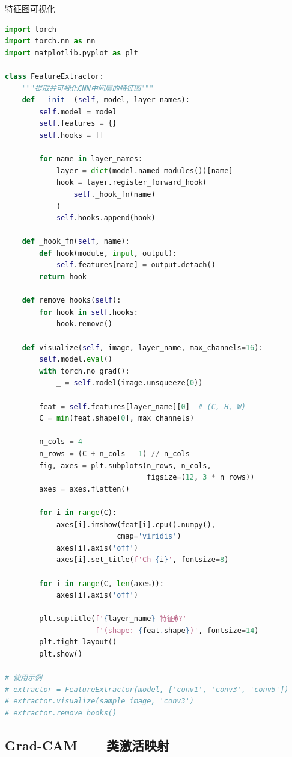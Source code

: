 \begin{mycode}{特征图可视化}
\begin{lstlisting}[language=Python]
import torch
import torch.nn as nn
import matplotlib.pyplot as plt

class FeatureExtractor:
    """提取并可视化CNN中间层的特征图"""
    def __init__(self, model, layer_names):
        self.model = model
        self.features = {}
        self.hooks = []

        for name in layer_names:
            layer = dict(model.named_modules())[name]
            hook = layer.register_forward_hook(
                self._hook_fn(name)
            )
            self.hooks.append(hook)

    def _hook_fn(self, name):
        def hook(module, input, output):
            self.features[name] = output.detach()
        return hook

    def remove_hooks(self):
        for hook in self.hooks:
            hook.remove()

    def visualize(self, image, layer_name, max_channels=16):
        self.model.eval()
        with torch.no_grad():
            _ = self.model(image.unsqueeze(0))

        feat = self.features[layer_name][0]  # (C, H, W)
        C = min(feat.shape[0], max_channels)

        n_cols = 4
        n_rows = (C + n_cols - 1) // n_cols
        fig, axes = plt.subplots(n_rows, n_cols,
                                 figsize=(12, 3 * n_rows))
        axes = axes.flatten()

        for i in range(C):
            axes[i].imshow(feat[i].cpu().numpy(),
                          cmap='viridis')
            axes[i].axis('off')
            axes[i].set_title(f'Ch {i}', fontsize=8)

        for i in range(C, len(axes)):
            axes[i].axis('off')

        plt.suptitle(f'{layer_name} 特征�?'
                     f'(shape: {feat.shape})', fontsize=14)
        plt.tight_layout()
        plt.show()

# 使用示例
# extractor = FeatureExtractor(model, ['conv1', 'conv3', 'conv5'])
# extractor.visualize(sample_image, 'conv3')
# extractor.remove_hooks()
\end{lstlisting}
\end{mycode}

\subsection{Grad-CAM——类激活映射}

